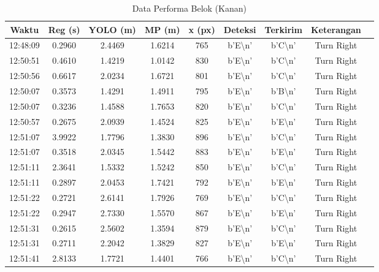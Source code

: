 \begin{table}[H]
    \centering
    \caption{Data Performa Belok (Kanan)}
    \label{tab:performa_belok_kanan}
    \begin{tabular}{|c|c|c|c|c|c|c|c|c|}
    \hline
    Waktu & Reg (s) & YOLO (m) & MP (m) & x (px) & Deteksi & Terkirim & Keterangan \\ \hline
    12:48:09 & 0.2960 & 2.4469 & 1.6214 & 765 & b'E\textbackslash n' & b'C\textbackslash n' & Turn Right \\ \hline
    12:50:51 & 0.4610 & 1.4219 & 1.0142 & 830 & b'E\textbackslash n' & b'C\textbackslash n' & Turn Right \\ \hline
    12:50:56 & 0.6617 & 2.0234 & 1.6721 & 801 & b'E\textbackslash n' & b'C\textbackslash n' & Turn Right \\ \hline
    12:50:07 & 0.3573 & 1.4291 & 1.4911 & 795 & b'E\textbackslash n' & b'B\textbackslash n' & Turn Right \\ \hline
    12:50:07 & 0.3236 & 1.4588 & 1.7653 & 820 & b'E\textbackslash n' & b'C\textbackslash n' & Turn Right \\ \hline
    12:50:57 & 0.2675 & 2.0939 & 1.4524 & 825 & b'E\textbackslash n' & b'E\textbackslash n' & Turn Right \\ \hline
    12:51:07 & 3.9922 & 1.7796 & 1.3830 & 896 & b'E\textbackslash n' & b'C\textbackslash n' & Turn Right \\ \hline
    12:51:07 & 0.3518 & 2.0345 & 1.5442 & 883 & b'E\textbackslash n' & b'E\textbackslash n' & Turn Right \\ \hline
    12:51:11 & 2.3641 & 1.5332 & 1.5242 & 850 & b'E\textbackslash n' & b'C\textbackslash n' & Turn Right \\ \hline
    12:51:11 & 0.2897 & 2.0453 & 1.7421 & 792 & b'E\textbackslash n' & b'E\textbackslash n' & Turn Right \\ \hline
    12:51:22 & 0.2721 & 2.6141 & 1.7926 & 769 & b'E\textbackslash n' & b'C\textbackslash n' & Turn Right \\ \hline
    12:51:22 & 0.2947 & 2.7330 & 1.5570 & 867 & b'E\textbackslash n' & b'E\textbackslash n' & Turn Right \\ \hline
    12:51:31 & 0.2615 & 2.5602 & 1.3594 & 879 & b'E\textbackslash n' & b'C\textbackslash n' & Turn Right \\ \hline
    12:51:31 & 0.2711 & 2.2042 & 1.3829 & 827 & b'E\textbackslash n' & b'E\textbackslash n' & Turn Right \\ \hline
    12:51:41 & 2.8133 & 1.7721 & 1.4401 & 766 & b'E\textbackslash n' & b'C\textbackslash n' & Turn Right \\ \hline

\end{tabular}
\end{table}
